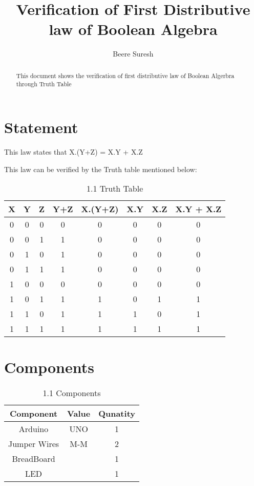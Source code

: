 \documentclass[journal,12pt,twocolumn]{IEEEtran}
\title{
Verification of First Distributive law of Boolean Algebra
}
\author{Beere Suresh}
\begin{document}
\maketitle
\begin{abstract}
This document shows the verification of first distributive law of Boolean Algerbra through Truth Table
\end{abstract}
\section{Statement}
This law states that 
X.(Y+Z) = X.Y + X.Z

This law can be verified by the Truth table mentioned below:
\begin{table}[h]
    	\centering
	\begin{tabular}{| c | c | c | c | c | c | c | c |}
	\hline
	\textbf{X} & \textbf{Y} & \textbf{Z} & \textbf{Y+Z} & \textbf{X.(Y+Z)} & \textbf{X.Y} & \textbf{X.Z} & \textbf{X.Y + X.Z} \\
	\hline
	0 & 0 & 0 & 0 & 0 & 0 & 0 & 0  \\
	 \hline
	 0 & 0 & 1 & 1 & 0 & 0 & 0 & 0  \\
	 \hline
	 0 & 1 & 0 & 1 & 0 & 0 & 0 & 0  \\
	 \hline
	0 & 1 & 1 & 1 & 0 & 0 & 0 & 0  \\
	\hline
	1 & 0 & 0 & 0 & 0 & 0 & 0 & 0  \\
	\hline
	1 & 0 & 1 & 1 & 1 & 0 & 1 & 1  \\
	\hline
	1 & 1 & 0 & 1 & 1 & 1 & 0 & 1  \\
	\hline
	1 & 1 & 1 & 1 & 1 & 1 & 1 & 1  \\
	\hline
	\end{tabular}
	\caption{1.1 Truth Table}
	\label{tab:my_label}
\end{table}
\section{Components}
\begin{table}[h]
	\centering
    	\begin{tabular}{| c | c | c |}
	\hline
	\textbf{Component}  &  \textbf{Value}  &  \textbf{Qunatity}\\
	\hline
	Arduino  & UNO & 1  \\
	\hline
	Jumper Wires  &  M-M  &  2  \\
	\hline
	BreadBoard  &    &  1\\
	\hline
	LED   &   &  1 \\
	\hline
\end{tabular}
\caption{1.1 Components}
\label{tab:my_label}
\end{table}
\end{document}
